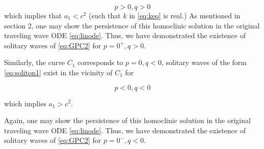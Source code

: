 \begin{equation}
p > 0, q > 0 
\end{equation}
which implies that $a_1 < c^2 $ (such that $k$ in \eqref{eq:keq} is real.)  As mentioned in section 2, one may show the persistence
of this homoclinic solution in the original traveling wave ODE \eqref{eq:linode}. Thus, we have 
demonstrated the existence of solitary waves of \eqref{eq:GPC2} for $p=0^+, q>0$. 

Similarly, the curve $C_1$ corresponds to $p=0,q<0$, solitary waves of the form \eqref{eq:soliton1} exist
in the vicinity of $C_1$ for 

\begin{equation}
p < 0, q < 0 
\end{equation}

which implies $ a_1 > c^2 $.

Again, one may show the persistence
of this homoclinic solution in the original traveling wave ODE \eqref{eq:linode}. Thus, we have 
demonstrated the existence of solitary waves of \eqref{eq:GPC2} for $p=0^-, q<0$.

